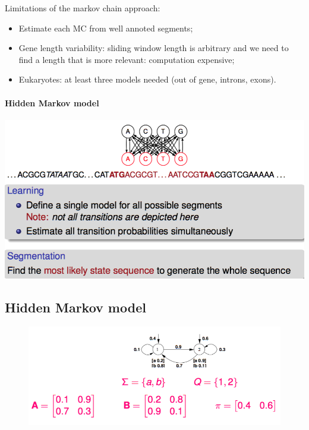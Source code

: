 Limitations of the markov chain approach:
\begin{itemize}
	\item Estimate each MC from well annoted segments;
	\item Gene length variability: sliding window length is arbitrary and we need to find a length that is more relevant: computation expensive;
	\item Eukaryotes: at least three models needed (out of gene, introns, exons).
\end{itemize}
\newpage
\paragraph{Hidden Markov model}

\begin{center}
	\includegraphics[scale=0.5]{images/22_hmms.png}
\end{center}

\subsection{Hidden Markov model}

\begin{figure}[htp]
	\centering
	\includegraphics[scale=0.5]{images/24_ex2.png}
\end{figure}

